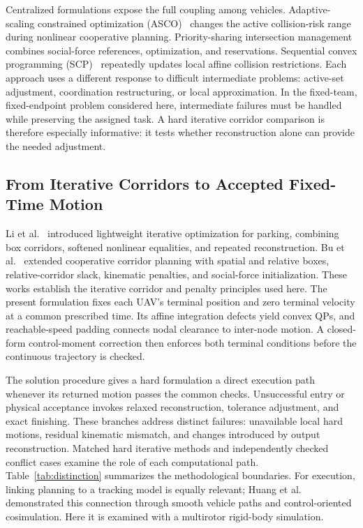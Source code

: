 Centralized formulations expose the full coupling among vehicles. Adaptive-scaling constrained optimization (ASCO)~\cite{li2021asco} changes the active collision-risk range during nonlinear cooperative planning. Priority-sharing intersection management~\cite{li2023priority} combines social-force references, optimization, and reservations. Sequential convex programming (SCP)~\cite{augugliaro2012} repeatedly updates local affine collision restrictions. Each approach uses a different response to difficult intermediate problems: active-set adjustment, coordination restructuring, or local approximation. In the fixed-team, fixed-endpoint problem considered here, intermediate failures must be handled while preserving the assigned task. A hard iterative corridor comparison is therefore especially informative: it tests whether reconstruction alone can provide the needed adjustment.

\subsection{From Iterative Corridors to Accepted Fixed-Time Motion}
Li et al.~\cite{li2022liom} introduced lightweight iterative optimization for parking, combining box corridors, softened nonlinear equalities, and repeated reconstruction. Bu et al.~\cite{bu2025} extended cooperative corridor planning with spatial and relative boxes, relative-corridor slack, kinematic penalties, and social-force initialization. These works establish the iterative corridor and penalty principles used here. The present formulation fixes each UAV's terminal position and zero terminal velocity at a common prescribed time. Its affine integration defects yield convex QPs, and reachable-speed padding connects nodal clearance to inter-node motion. A closed-form control-moment correction then enforces both terminal conditions before the continuous trajectory is checked.

The solution procedure gives a hard formulation a direct execution path whenever its returned motion passes the common checks. Unsuccessful entry or physical acceptance invokes relaxed reconstruction, tolerance adjustment, and exact finishing. These branches address distinct failures: unavailable local hard motions, residual kinematic mismatch, and changes introduced by output reconstruction. Matched hard iterative methods and independently checked conflict cases examine the role of each computational path. Table~\ref{tab:distinction} summarizes the methodological boundaries. For execution, linking planning to a tracking model is equally relevant; Huang et al.~\cite{huang2022srn} demonstrated this connection through smooth vehicle paths and control-oriented cosimulation. Here it is examined with a multirotor rigid-body simulation.

